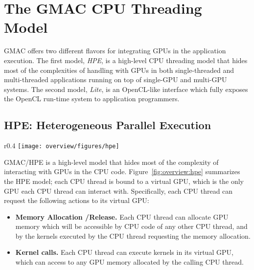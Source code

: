 \section{The GMAC CPU Threading Model}

GMAC offers two different flavors for integrating GPUs in the application execution. The first 
model, \emph{HPE}, is a high\hyp{}level CPU threading model that hides most of the complexities of 
handling with GPUs in both single\hyp{}threaded and multi\hyp{}threaded applications running on top 
of single\hyp{}GPU and multi\hyp{}GPU systems. The second model, \emph{Lite}, is an OpenCL\hyp{}like 
interface which fully exposes the OpenCL run\hyp{}time system to application programmers.

\subsection{HPE: Heterogeneous Parallel Execution}

\begin{wrapfigure}{r}{0.4\linewidth}
\vspace{-20pt}
\texttt{[image: overview/figures/hpe]}
\vspace{-20pt}
\caption{HPE CPU Threading model.}
\label{fig:overview:hpe}
\vspace{-20pt}
\end{wrapfigure}

GMAC\slash HPE is a high\hyp{}level model that hides most of the complexity of interacting with GPUs 
in the CPU code. Figure~\ref{fig:overview:hpe} summarizes the HPE model; each CPU thread is bound to 
a virtual GPU, which is the only GPU each CPU thread can interact with. Specifically, each CPU 
thread can request the following actions to its virtual GPU:
\begin{itemize}
\item \textbf{Memory Allocation \slash Release.} Each CPU thread can allocate GPU memory which will 
be accessible by CPU code of any other CPU thread, and by the kernels executed by the CPU thread 
requesting the memory allocation.
\item \textbf{Kernel calls.} Each CPU thread can execute kernels in its virtual GPU, which can 
access to any GPU memory allocated by the calling CPU thread.
\end{itemize}


